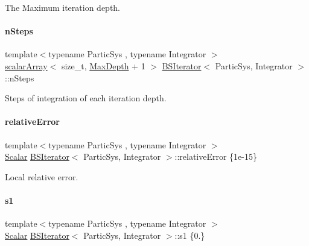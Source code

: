 The Maximum iteration depth. 

\mbox{\label{class_b_s_iterator_a9c4c8c17a759cdff694e0bd62ed249bd}} 
\paragraph{\texorpdfstring{n\+Steps}{nSteps}}
{\footnotesize\ttfamily template$<$typename Partic\+Sys , typename Integrator $>$ \\
\mbox{\hyperlink{class_b_s_iterator_ab0aa7c10b56500273af05dcd85fd8389}{scalar\+Array}}$<$ size\+\_\+t, \mbox{\hyperlink{class_b_s_iterator_a39409b9a12d4854d101ce59a0efc0f74}{Max\+Depth}} + 1 $>$ \mbox{\hyperlink{class_b_s_iterator}{B\+S\+Iterator}}$<$ Partic\+Sys, Integrator $>$\+::n\+Steps\hspace{0.3cm}{\ttfamily [private]}}



Steps of integration of each iteration depth. 

\mbox{\label{class_b_s_iterator_abce71b7bac10363f7772dc848f8722b6}} 
\paragraph{\texorpdfstring{relative\+Error}{relativeError}}
{\footnotesize\ttfamily template$<$typename Partic\+Sys , typename Integrator $>$ \\
\mbox{\hyperlink{class_b_s_iterator_a7857f8ff9032955ea4dcc22cd18ca7a1}{Scalar}} \mbox{\hyperlink{class_b_s_iterator}{B\+S\+Iterator}}$<$ Partic\+Sys, Integrator $>$\+::relative\+Error \{1e-\/15\}\hspace{0.3cm}{\ttfamily [private]}}



Local relative error. 

\mbox{\label{class_b_s_iterator_a942f85e00c28ef1990d1dfbed69c9e13}} 
\paragraph{\texorpdfstring{s1}{s1}}
{\footnotesize\ttfamily template$<$typename Partic\+Sys , typename Integrator $>$ \\
\mbox{\hyperlink{class_b_s_iterator_a7857f8ff9032955ea4dcc22cd18ca7a1}{Scalar}} \mbox{\hyperlink{class_b_s_iterator}{B\+S\+Iterator}}$<$ Partic\+Sys, Integrator $>$\+::s1 \{0.\}\hspace{0.3cm}{\ttfamily [private]}}



